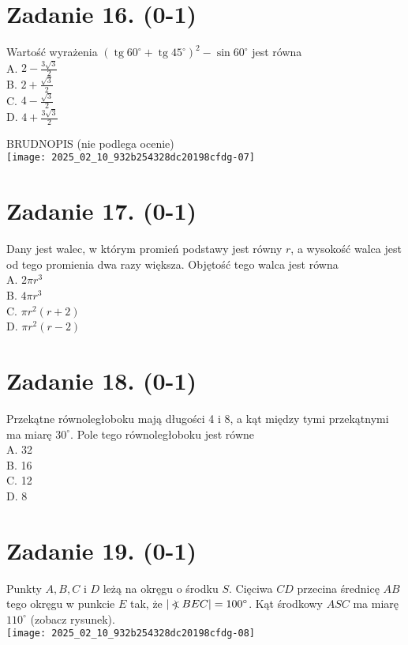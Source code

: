 \documentclass[10pt]{article}
\newcommand\Varangle{\mathop{{<\!\!\!\!\!\text{\small)}}\:}\nolimits}
\begin{document}
\section*{Zadanie 16. (0-1)}
Wartość wyrażenia \(\left(\operatorname{tg} 60^{\circ}+\operatorname{tg} 45^{\circ}\right)^{2}-\sin 60^{\circ}\) jest równa\\
A. \(2-\frac{3 \sqrt{3}}{2}\)\\
B. \(2+\frac{\sqrt{3}}{2}\)\\
C. \(4-\frac{\sqrt{3}}{2}\)\\
D. \(4+\frac{3 \sqrt{3}}{2}\)

BRUDNOPIS (nie podlega ocenie)\\
\texttt{[image: 2025\_02\_10\_932b254328dc20198cfdg-07]}

\section*{Zadanie 17. (0-1)}
Dany jest walec, w którym promień podstawy jest równy \(r\), a wysokość walca jest od tego promienia dwa razy większa. Objętość tego walca jest równa\\
A. \(2 \pi r^{3}\)\\
B. \(4 \pi r^{3}\)\\
C. \(\pi r^{2}(r+2)\)\\
D. \(\pi r^{2}(r-2)\)

\section*{Zadanie 18. (0-1)}
Przekątne równoległoboku mają długości 4 i 8, a kąt między tymi przekątnymi ma miarę \(30^{\circ}\). Pole tego równoległoboku jest równe\\
A. 32\\
B. 16\\
C. 12\\
D. 8

\section*{Zadanie 19. (0-1)}
Punkty \(A, B, C\) i \(D\) leżą na okręgu o środku \(S\). Cięciwa \(C D\) przecina średnicę \(A B\) tego okręgu w punkcie \(E\) tak, że \(|\Varangle B E C|=100^{\circ}\). Kąt środkowy \(A S C\) ma miarę \(110^{\circ}\) (zobacz rysunek).\\
\texttt{[image: 2025\_02\_10\_932b254328dc20198cfdg-08]}
\end{document}
